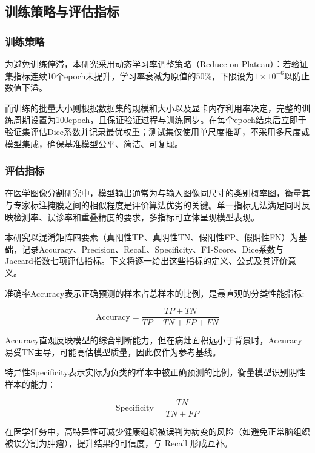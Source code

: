 \subsection{训练策略与评估指标}

\subsubsection{训练策略}

为避免训练停滞，本研究采用动态学习率调整策略（Reduce-on-Plateau）：若验证集指标连续10个epoch未提升，学习率衰减为原值的50\%，下限设为$1 \times 10^{-6}$以防止数值下溢。

而训练的批量大小则根据数据集的规模和大小以及显卡内存利用率决定，完整的训练周期设置为100epoch，且保证验证过程与训练同步。在每个epoch结束后立即于验证集评估Dice系数并记录最优权重；测试集仅使用单尺度推断，不采用多尺度或模型集成，确保基准模型公平、简洁、可复现。

\subsubsection{评估指标}

在医学图像分割研究中，模型输出通常为与输入图像同尺寸的类别概率图，衡量其与专家标注掩膜之间的相似程度是评价算法优劣的关键。单一指标无法满足同时反映检测率、误诊率和重叠精度的要求，多指标可立体呈现模型表现。

本研究以混淆矩阵四要素（真阳性TP、真阴性TN、假阳性FP、假阴性FN）为基础，记录Accuracy、Precision、Recall、Specificity、F1-Score、Dice系数与Jaccard指数七项评估指标。下文将逐一给出这些指标的定义、公式及其评价意义。

准确率Accuracy表示正确预测的样本占总样本的比例，是最直观的分类性能指标:

\begin{equation}
    \mathrm{Accuracy}=\frac{TP+TN}{TP+TN+FP+FN}
\end{equation}

Accuracy直观反映模型的综合判断能力，但在病灶面积远小于背景时，Accuracy易受TN主导，可能高估模型质量，因此仅作为参考基线。

特异性Specificity表示实际为负类的样本中被正确预测的比例，衡量模型识别阴性样本的能力：

\begin{equation}
    \mathrm{Specificity}=\frac{T N}{T N+F P}
\end{equation}

在医学任务中，高特异性可减少健康组织被误判为病变的风险（如避免正常脑组织被误分割为肿瘤），提升结果的可信度，与 Recall 形成互补。

